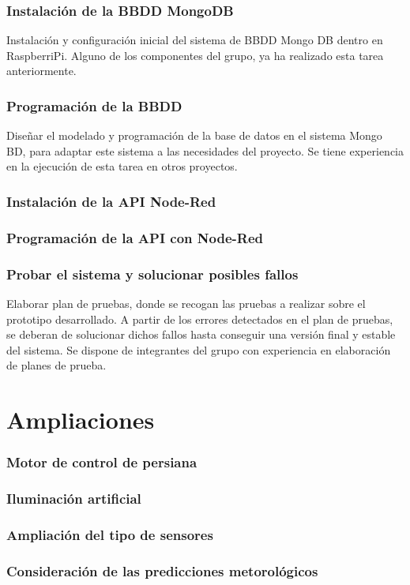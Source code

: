 \documentclass[12pt,a4paper,titlepage,oneside]{report}
\begin{document}
	\subsection*{Instalación de la BBDD MongoDB}
	Instalación y configuración inicial del sistema de BBDD Mongo DB dentro en RaspberriPi. Alguno de los componentes del grupo, ya ha realizado esta tarea anteriormente.
	
	\subsection*{Programación de la BBDD}
	Diseñar el modelado y programación de la base de datos en el sistema Mongo BD, para adaptar este sistema a las necesidades del proyecto. Se tiene experiencia en la ejecución de esta tarea en otros proyectos.
	
	\subsection*{Instalación de la API Node-Red}
	
	\subsection*{Programación de la API con Node-Red}
	
	\subsection*{Probar el sistema y solucionar posibles fallos}
	Elaborar plan de pruebas, donde se recogan las pruebas a realizar sobre el prototipo desarrollado. A partir de los errores detectados en el plan de pruebas, se deberan de solucionar dichos fallos hasta conseguir una versión final y estable del sistema.
	Se dispone de integrantes del grupo con experiencia en elaboración de planes de prueba.
	

\chapter{Ampliaciones}

	\subsection*{Motor de control de persiana}
	\subsection*{Iluminación artificial}
	\subsection*{Ampliación del tipo de sensores}
	\subsection*{Consideración de las predicciones metorológicos}


	
\end{document}
